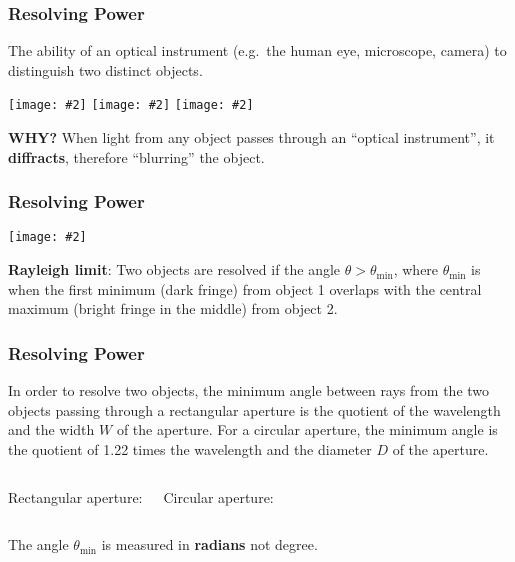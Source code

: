 \documentclass[compress,aspectratio=169]{beamer}
\newcommand{\pic}[2]{\texttt{[image: \#2]}}
\newcommand{\eq}[2]{\vspace{#1}{\LARGE\begin{displaymath}#2\end{displaymath}}}
\begin{document}
\begin{frame}
  \frametitle{Resolving Power}
  The ability of an optical instrument (e.g.\ the human eye, microscope,
  camera) to distinguish two distinct objects.
  \begin{center}
    \pic{0.322}{graphics/resolve1.png}\hspace{.05in}
    \pic{0.322}{graphics/resolve2.png}\hspace{.05in}
    \pic{0.322}{graphics/resolve3.png}\hspace{.05in}
  \end{center}
  \textbf{WHY?} When light from any object passes through an 
  ``optical instrument'', it \textbf{diffracts}, therefore ``blurring'' the
  object.
\end{frame}

\begin{frame}
  \frametitle{Resolving Power}
  \begin{minipage}{.55\textwidth}
      \pic{.95}{graphics/resolve4.png}
  \end{minipage}
  \begin{minipage}{.42\textwidth}
    \textbf{Rayleigh limit}: Two objects are resolved if the angle
    $\theta>\theta_\mathrm{min}$, where $\theta_\mathrm{min}$ is when the first
    minimum (dark fringe) from object 1 overlaps with the central maximum
    (bright fringe in the middle) from object 2.
  \end{minipage}
\end{frame}
\begin{frame}
  \frametitle{Resolving Power}
  In order to resolve two objects, the minimum angle between rays from the two
  objects passing through a rectangular aperture is the quotient of the
  wavelength and the width $W$ of the aperture. For a circular aperture, the
  minimum angle is the quotient of 1.22 times the wavelength and the diameter
  $D$ of the aperture.
  \vspace{0.2in}
  \begin{columns}
    Rectangular aperture:

    \eq{-.2in}{
      \boxed{\theta_\mathrm{min}=\frac{\lambda}{W}}
    }
    Circular aperture:

    \eq{-.2in}{
      \boxed{\theta_\mathrm{min}=\frac{1.22\lambda}{D}}
    }
  \end{columns}
  The angle $\theta_\mathrm{min}$ is measured in \textbf{radians} not degree.
\end{frame}
\end{document}

